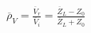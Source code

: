 \(\overline{\rho}_V=\frac{\overline{V}_r}{\overline{V}_i}=\frac{\overline{Z}_L-Z_0}{\overline{Z}_L+Z_0}\)
